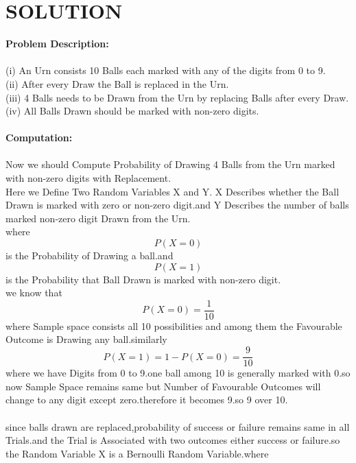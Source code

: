 \documentclass[journal,12pt,twocolumn]{IEEEtran}
\begin{document}
\section{\textbf{SOLUTION}}
\textbf{Problem  Description:}\\ \\
(i) An Urn consists 10 Balls each marked with any of the digits from 0 to 9.\\
(ii) After every Draw the Ball is replaced in the Urn.\\
(iii) 4 Balls needs to be Drawn from the Urn by replacing Balls after every Draw.\\
(iv) All Balls Drawn should be marked with non-zero digits.\\ \\
\textbf{Computation:}\\ \\
Now we should Compute Probability of Drawing 4 Balls from the Urn marked with non-zero digits with Replacement.\\
Here we Define Two Random Variables X and Y. X Describes whether the Ball Drawn is marked with zero or non-zero digit.and Y Describes the number of balls marked non-zero digit Drawn from the Urn.\\
where
\begin{equation*}
    P(X=0) 
\end{equation*}
is the Probability of Drawing a ball.and
\begin{equation*}
    P(X=1)
\end{equation*}
is the Probability that Ball Drawn is marked with non-zero digit.\\
we know that
\begin{equation*}
    P(X=0)=\frac{1}{10}
\end{equation*}
where Sample space consists all 10 possibilities and among  them the Favourable Outcome is Drawing any ball.similarly
\begin{equation*}
    P(X=1)=1-P(X=0)=\frac{9}{10}
\end{equation*}
where we have Digits from 0 to 9.one ball among 10 is generally marked with 0.so now Sample Space remains same but Number of Favourable Outcomes will change to any digit except zero.therefore it becomes 9.so 9 over 10.\\  \\
since balls drawn are replaced,probability of success or failure remains same in all Trials.and the Trial is Associated with two outcomes either success or failure.so the Random Variable X is a Bernoulli Random Variable.where 
\end{document}
